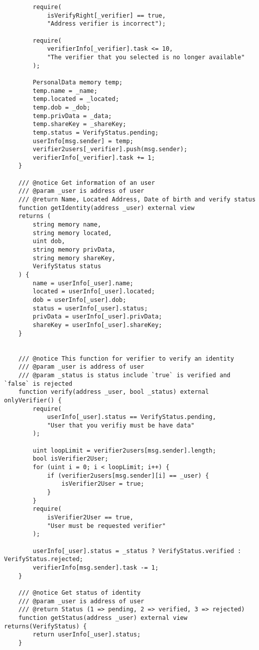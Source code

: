 \documentclass[../main-report.tex]{subfiles}
\begin{document}
\begin{lstlisting}
        require(
            isVerifyRight[_verifier] == true,
            "Address verifier is incorrect");
        
        require(
            verifierInfo[_verifier].task <= 10,
            "The verifier that you selected is no longer available"
        );

        PersonalData memory temp;
        temp.name = _name;
        temp.located = _located;
        temp.dob = _dob;
        temp.privData = _data;
        temp.shareKey = _shareKey;
        temp.status = VerifyStatus.pending;
        userInfo[msg.sender] = temp;
        verifier2users[_verifier].push(msg.sender);
        verifierInfo[_verifier].task += 1;
    }

    /// @notice Get information of an user
    /// @param _user is address of user
    /// @return Name, Located Address, Date of birth and verify status
    function getIdentity(address _user) external view
    returns (
        string memory name,
        string memory located,
        uint dob,
        string memory privData,
        string memory shareKey,
        VerifyStatus status
    ) {
        name = userInfo[_user].name;
        located = userInfo[_user].located;
        dob = userInfo[_user].dob;
        status = userInfo[_user].status;
        privData = userInfo[_user].privData;
        shareKey = userInfo[_user].shareKey;
    }


    /// @notice This function for verifier to verify an identity
    /// @param _user is address of user
    /// @param _status is status include `true` is verified and `false` is rejected
    function verify(address _user, bool _status) external onlyVerifier() {
        require(
            userInfo[_user].status == VerifyStatus.pending,
            "User that you verifiy must be have data"
        );

        uint loopLimit = verifier2users[msg.sender].length;
        bool isVerifier2User;
        for (uint i = 0; i < loopLimit; i++) {
            if (verifier2users[msg.sender][i] == _user) {
                isVerifier2User = true;
            }
        }
        require(
            isVerifier2User == true,
            "User must be requested verifier"
        );

        userInfo[_user].status = _status ? VerifyStatus.verified : VerifyStatus.rejected;
        verifierInfo[msg.sender].task -= 1;
    }

    /// @notice Get status of identity
    /// @param _user is address of user
    /// @return Status (1 => pending, 2 => verified, 3 => rejected)
    function getStatus(address _user) external view returns(VerifyStatus) {
        return userInfo[_user].status;
    }


\end{lstlisting}
\end{document}
